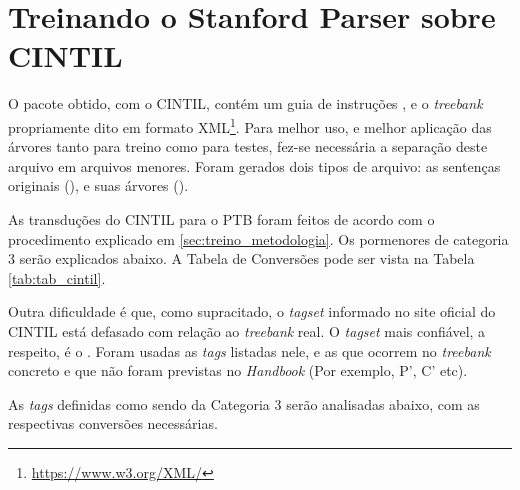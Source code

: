 \section{Treinando o Stanford Parser sobre CINTIL}
\label{sec:treinando_sp_cintil}

O pacote obtido, com o CINTIL, contém um guia de instruções \cite{narrativeDescriptionCintil}, e o \textit{treebank} propriamente dito em formato XML\footnote{\url{https://www.w3.org/XML/}}. Para melhor uso, e melhor aplicação das árvores tanto para treino como para testes, fez-se necessária a separação deste arquivo em arquivos menores. Foram gerados dois tipos de arquivo: as sentenças originais (), e suas árvores ().

As transduções do CINTIL para o PTB foram feitos de acordo com o procedimento explicado em \ref{sec:treino_metodologia}. Os pormenores de categoria 3 serão explicados abaixo. A Tabela de Conversões pode ser vista na Tabela \ref{tab:tab_cintil}.

Outra dificuldade é que, como supracitado, o \textit{tagset} informado no site oficial do CINTIL está defasado com relação ao \textit{treebank} real. O \textit{tagset} mais confiável, a respeito, é o  \cite{cintil_handbook}. Foram usadas as \textit{tags} listadas nele, e as que ocorrem no \textit{treebank} concreto e que não foram previstas no \textit{Handbook} (Por exemplo, P’, C’ etc).

\begin{center}

\end{center}

As \textit{tags} definidas como sendo da Categoria 3 serão analisadas abaixo, com as respectivas conversões necessárias.
